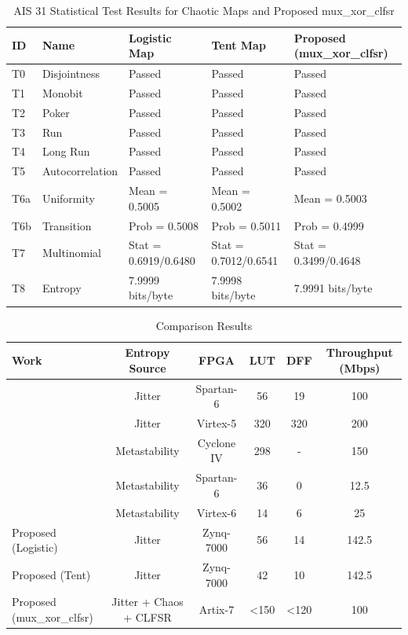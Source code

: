 \begin{table}[t]
\centering
\caption{AIS 31 Statistical Test Results for Chaotic Maps and Proposed mux\_xor\_clfsr}
\label{tab:ais31_results}
\begin{tabular}{lllll}
\hline\hline
\textbf{ID} & \textbf{Name} & \textbf{Logistic Map} & \textbf{Tent Map} & \textbf{Proposed (mux\_xor\_clfsr)} \\
\hline
T0 & Disjointness & Passed & Passed & Passed \\
T1 & Monobit & Passed & Passed & Passed \\
T2 & Poker & Passed & Passed & Passed \\
T3 & Run & Passed & Passed & Passed \\
T4 & Long Run & Passed & Passed & Passed \\
T5 & Autocorrelation & Passed & Passed & Passed \\
\hline
T6a & Uniformity & Mean = 0.5005 & Mean = 0.5002 & Mean = 0.5003 \\
T6b & Transition & Prob = 0.5008 & Prob = 0.5011 & Prob = 0.4999 \\
T7 & Multinomial & Stat = 0.6919/0.6480 & Stat = 0.7012/0.6541 & Stat = 0.3499/0.4648 \\
T8 & Entropy & 7.9999 bits/byte & 7.9998 bits/byte & 7.9991 bits/byte \\
\hline\hline
\end{tabular}
\end{table}

\begin{table}[t]
\centering
\caption{Comparison Results}
\label{tab:comparison}
\begin{tabular}{lccccc}
\hline\hline
\textbf{Work} & \textbf{Entropy Source} & \textbf{FPGA} & \textbf{LUT} & \textbf{DFF} & \textbf{Throughput (Mbps)} \\
\hline
[3] & Jitter & Spartan-6 & 56 & 19 & 100 \\
[12] & Jitter & Virtex-5 & 320 & 320 & 200 \\
[13] & Metastability & Cyclone IV & 298 & - & 150 \\
[14] & Metastability & Spartan-6 & 36 & 0 & 12.5 \\
[15] & Metastability & Virtex-6 & 14 & 6 & 25 \\
Proposed (Logistic) & Jitter & Zynq-7000 & 56 & 14 & 142.5 \\
Proposed (Tent) & Jitter & Zynq-7000 & 42 & 10 & 142.5 \\
Proposed (mux_xor_clfsr) & Jitter + Chaos + CLFSR & Artix-7 & <150 & <120 & 100 \\
\hline\hline
\end{tabular}
\end{table}
